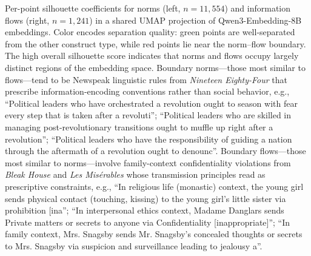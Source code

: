 \caption{Per-point silhouette coefficients for norms (left, $n=11,554$) and information flows (right, $n=1,241$) in a shared UMAP projection of Qwen3-Embedding-8B embeddings. Color encodes separation quality: green points are well-separated from the other construct type, while red points lie near the norm--flow boundary. The high overall silhouette score indicates that norms and flows occupy largely distinct regions of the embedding space. Boundary norms---those most similar to flows---tend to be Newspeak linguistic rules from \textit{Nineteen Eighty-Four} that prescribe information-encoding conventions rather than social behavior, e.g., ``Political leaders who have orchestrated a revolution ought to season with fear every step that is taken after a revoluti''; ``Political leaders who are skilled in managing post-revolutionary transitions ought to muffle up right after a revolution''; ``Political leaders who have the responsibility of guiding a nation through the aftermath of a revolution ought to denounc''. Boundary flows---those most similar to norms---involve family-context confidentiality violations from \textit{Bleak House} and \textit{Les Mis\'{e}rables} whose transmission principles read as prescriptive constraints, e.g., ``In religious life (monastic) context, the young girl sends physical contact (touching, kissing) to the young girl's little sister via prohibition [ina''; ``In interpersonal ethics context, Madame Danglars sends Private matters or secrets to anyone via Confidentiality [inappropriate]''; ``In family context, Mrs. Snagsby sends Mr. Snagsby's concealed thoughts or secrets to Mrs. Snagsby via suspicion and surveillance leading to jealousy a''.}
